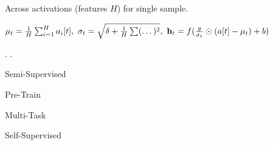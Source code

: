 \begin{definition}
    Across activations (features \(H\)) for single sample.

    \(\mu_t = \frac{1}{H}\sum_{i=1}^H a_i[t], \ \sigma_t = \sqrt{\delta + \frac{1}{H}\sum (\dots)^2}, \ \h_t = f(\frac{g}{\sigma_t} \odot (a[t] - \mu_t) + b)\)

    .
    .
\end{definition}

\begin{definition}
    \begin{itemize*}
        \item Semi-Supervised
        \item Pre-Train
        \item Multi-Task
        \item Self-Supervised
    \end{itemize*}
\end{definition}